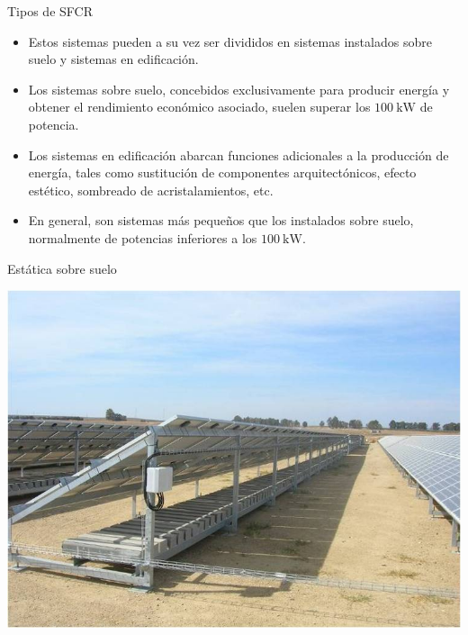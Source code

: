 \documentclass[xcolor={usenames,svgnames,dvipsnames}]{beamer}
\begin{document}
\begin{frame}[label={sec:org8deed78}]{Tipos de SFCR}
\begin{itemize}
\item Estos sistemas pueden a su vez ser divididos en sistemas instalados
sobre suelo y sistemas en edificación.

\item Los sistemas sobre suelo, concebidos exclusivamente para producir
energía y obtener el rendimiento económico asociado, suelen superar
los \(\SI{100}{\kilo\watt}\) de potencia.

\item Los sistemas en edificación abarcan funciones adicionales a la
producción de energía, tales como sustitución de componentes
arquitectónicos, efecto estético, sombreado de acristalamientos,
etc.

\item En general, son sistemas más pequeños que los instalados sobre
suelo, normalmente de potencias inferiores a los
\(\SI{100}{\kilo\watt}\).
\end{itemize}
\end{frame}

\begin{frame}[label={sec:orgb4f6646}]{Estática sobre suelo}
\begin{center}
\includegraphics[width=.9\linewidth]{../figs/EstructuraEstaticaSuelo.jpg}
\end{center}
\end{frame}
\end{document}
